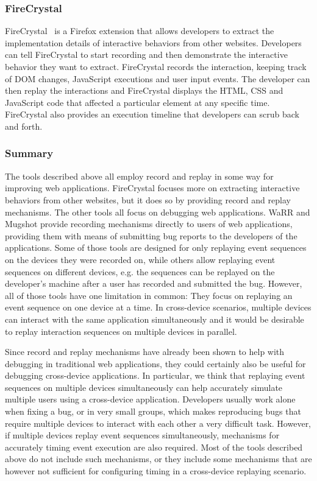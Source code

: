 \subsubsection{FireCrystal}

FireCrystal~\cite{firecrystal2009} is a Firefox extension that allows developers to extract the implementation details of interactive behaviors from other websites. Developers can tell FireCrystal to start recording and then demonstrate the interactive behavior they want to extract. FireCrystal records the interaction, keeping track of DOM changes, JavaScript executions and user input events. The developer can then replay the interactions and FireCrystal displays the HTML, CSS and JavaScript code that affected a particular element at any specific time. FireCrystal also provides an execution timeline that developers can scrub back and forth.

\subsubsection{Summary}

The tools described above all employ record and replay in some way for improving web applications. FireCrystal focuses more on extracting interactive behaviors from other websites, but it does so by providing record and replay mechanisms. The other tools all focus on debugging web applications. WaRR and Mugshot provide recording mechanisms directly to users of web applications, providing them with means of submitting bug reports to the developers of the applications. Some of those tools are designed for only replaying event sequences on the devices they were recorded on, while others allow replaying event sequences on different devices, e.g. the sequences can be replayed on the developer's machine after a user has recorded and submitted the bug. However, all of those tools have one limitation in common: They focus on replaying an event sequence on one device at a time. In cross-device scenarios, multiple devices can interact with the same application simultaneously and it would be desirable to replay interaction sequences on multiple devices in parallel.

Since record and replay mechanisms have already been shown to help with debugging in traditional web applications, they could certainly also be useful for debugging cross-device applications. In particular, we think that replaying event sequences on multiple devices simultaneously can help accurately simulate multiple users using a cross-device application. Developers usually work alone when fixing a bug, or in very small groups, which makes reproducing bugs that require multiple devices to interact with each other a very difficult task. However, if multiple devices replay event sequences simultaneously, mechanisms for accurately timing event execution are also required. Most of the tools described above do not include such mechanisms, or they include some mechanisms that are however not sufficient for configuring timing in a cross-device replaying scenario.


